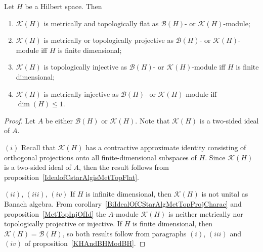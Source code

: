 \begin{proposition}\label{KHAndBHModKH} Let $H$ be a Hilbert space. Then 

\begin{enumerate}[label = (\roman*)]
    \item $\mathcal{K}(H)$ is metrically and topologically flat 
    as $\mathcal{B}(H)$- or $\mathcal{K}(H)$-module;

    \item $\mathcal{K}(H)$ is metrically or topologically projective as
    $\mathcal{B}(H)$- or $\mathcal{K}(H)$-module iff $H$ is finite dimensional;

    \item $\mathcal{K}(H)$ is topologically injective as $\mathcal{B}(H)$- 
    or $\mathcal{K}(H)$-module iff $H$ is finite dimensional;

    \item $\mathcal{K}(H)$ is metrically injective as $\mathcal{B}(H)$- 
    or $\mathcal{K}(H)$-module iff $\dim(H)\leq 1$.
\end{enumerate}
\end{proposition}
\begin{proof} Let $A$ be either $\mathcal{B}(H)$ or $\mathcal{K}(H)$. Note that
$\mathcal{K}(H)$ is a two-sided ideal of $A$. 

$(i)$ Recall that $\mathcal{K}(H)$ has a contractive approximate identity
consisting of orthogonal projections onto all finite-dimensional subspaces of
$H$. Since $\mathcal{K}(H)$ is a two-sided ideal of $A$, then the result follows
from proposition~\ref{IdealofCstarAlgisMetTopFlat}.

$(ii)$, $(iii)$, $(iv)$ If $H$ is infinite dimensional, then $\mathcal{K}(H)$ is
not unital as Banach algebra. From
corollary~\ref{BiIdealOfCStarAlgMetTopProjCharac} and
proposition~\ref{MetTopInjOfId} the $A$-module $\mathcal{K}(H)$ is neither
metrically nor topologically projective or injective. If $H$ is finite
dimensional, then $\mathcal{K}(H)=\mathcal{B}(H)$, so both results follow from
paragraphs $(i)$, $(iii)$ and $(iv)$ of proposition~\ref{KHAndBHModBH}.
\end{proof}

